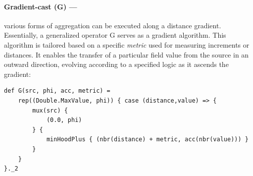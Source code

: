 \paragraph*{Gradient-cast (G) --- }
various forms of aggregation 
 can be executed along a distance gradient.
 Essentially, a generalized operator G serves as a gradient algorithm. 
 This algorithm is tailored based on a specific \emph{metric} used for measuring increments or distances. 
 It enables the transfer of a particular field value from the source in an outward direction, 
 evolving according to a specified logic as it ascends the gradient:
\begin{lstlisting}
def G(src, phi, acc, metric) =
    rep((Double.MaxValue, phi)) { case (distance,value) => {
        mux(src) {
            (0.0, phi)
        } {
            minHoodPlus { (nbr(distance) + metric, acc(nbr(value))) }
        }
    }
}._2
\end{lstlisting}
